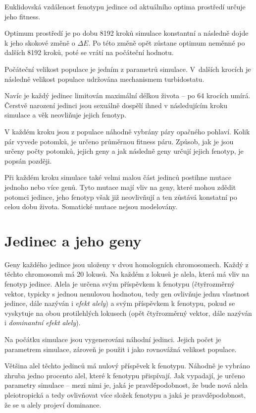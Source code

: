 Euklidovská vzdálenost fenotypu jedince od aktuálního optima prostředí určuje jeho fitness.

Optimum prostředí je po dobu 8192 kroků simulace konstantní a následně dojde k jeho skokové změně o
$\Delta{}E$. Po této změně opět zůstane optimum neměnné po dalších 8192 kroků, poté se vrátí na počáteční hodnotu.

Počáteční velikost populace je jedním z parametrů simulace. V~dalších krocích je následně velikost populace udržována
mechanismem turbidostatu.

Navíc je každý jedinec limitován maximální délkou života -- po 64 krocích umírá.
Čerstvě narození jedinci jsou sexuálně dospělí ihned v následujícím kroku simulace a věk neovliňuje jejich fenotyp.

V každém kroku jsou z populace náhodně vybrány páry opačného pohlaví.
Kolik pár vyvede potomků, je určeno průměrnou fitness páru. Způsob, jak je jsou určeny počty potomků, jejich geny a
jak následně geny určují jejich fenotyp, je popsán později.

Při každém kroku simulace také velmi malou část jedinců postihne mutace jednoho nebo více genů. Tyto mutace mají
vliv na geny, které mohou zdědit potomci jedince, jeho fenotyp však již neovlivňují a ten zůstává konstatní po celou
dobu života. Somatické mutace nejsou modelovány.

\section{Jedinec a jeho geny}

Geny každého jedince jsou uloženy v dvou homologních chromosomech. Každý z těchto chromosomů má 20 lokusů.
Na každém z lokusů je alela, která má vliv na fenotyp jedince. Alela je určena svým příspěvkem k fenotypu (čtyřrozměrný
vektor, typicky s jednou nenulovou hodnotou, tedy gen ovlivňuje jednu vlastnost jedince, dále nazýván i
\textit{efekt alely}) a svým příspěvkem k fenotypu, pokud se vyskytuje na obou protilehlých lokusech
(opět čtyřrozměrný vektor, dále nazýván i \textit{dominantní efekt alely}).

Na počátku simulace jsou vygenerováni náhodní jedinci. Jejich počet je parametrem simulace, zároveň je použit i jako
rovnovážná velikost populace.

Většina alel těchto jedinců má nulový příspěvek k fenotypu. Náhodně je vybráno zhruba jedno procento alel, které k
fenotypu přispívají. Jak vypadají, je určeno parametry simulace -- mezi nimi je, jaká je pravděpodobnost, že bude
nová alela pleiotropická a tedy ovlivňovat více složek fenotypu a jaká je pravděpodobnost,
že se u alely projeví dominance.

